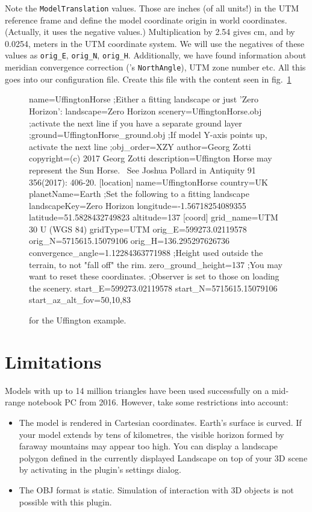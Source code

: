 Note the \texttt{ModelTranslation} values. Those are inches (of all units!) in the UTM reference frame 
and define the model coordinate origin in world coordinates. (Actually, it uses the negative values.) 
Multiplication by 2.54 gives cm, and by 0.0254, meters in the UTM coordinate system. 
We will use the negatives of these values as \texttt{orig\_E}, \texttt{orig\_N}, \texttt{orig\_H}. 
Additionally, we have found information about meridian convergence correction ('s \texttt{NorthAngle}), 
UTM zone number etc. All this goes into our configuration file. 
Create this file  with the content seen in fig.~\ref{fig:scenery3d:UffingtonIni}
\begin{figure}[p]
\begin{configfile}
[model]
name=UffingtonHorse
;Either a fitting landscape or just 'Zero Horizon':
landscape=Zero Horizon
scenery=UffingtonHorse.obj
;activate the next line if you have a separate ground layer 
;ground=UffingtonHorse_ground.obj
;If model Y-axis points up, activate the next line
;obj_order=XZY
author=Georg Zotti
copyright=(c) 2017 Georg Zotti
description=Uffington Horse may represent the Sun Horse. \
        See Joshua Pollard in Antiquity 91 356(2017): 406-20.
[location]
name=UffingtonHorse
country=UK
planetName=Earth
;Set the following to a fitting landscape
landscapeKey=Zero Horizon
longitude=-1.56718254089355
latitude=51.5828432749823
altitude=137
[coord]
grid_name=UTM 30 U (WGS 84)
gridType=UTM
orig_E=599273.02119578
orig_N=5715615.15079106
orig_H=136.295297626736
convergence_angle=1.12284363771988
;Height used outside the terrain, to not "fall off" the rim.
zero_ground_height=137
;You may want to reset these coordinates. 
;Observer is set to those on loading the scenery.
start_E=599273.02119578
start_N=5715615.15079106
start_az_alt_fov=50,10,83
\end{configfile}
\caption{ for the Uffington example.}
\label{fig:scenery3d:UffingtonIni}
\end{figure}

\section{Limitations}
\label{sec:scenery3d:Limitations}

Models with up to 14 million triangles have been used successfully on
a mid-range notebook PC from 2016. However, take some restrictions
into account:

\begin{itemize}
\item The model is rendered in Cartesian coordinates. Earth's surface
  is curved. If your model extends by tens of kilometres, the visible
  horizon formed by faraway mountains may appear too high. You can
  \newFeature{0.20.2} display a landscape polygon defined in the
  currently displayed Landscape on top of your 3D scene by activating
  \menu{Draw horizon polyline in foreground} in the plugin's
  settings dialog.
\item
  The OBJ format is static. Simulation of interaction with 3D objects
  is not possible with this plugin.
\end{itemize}

